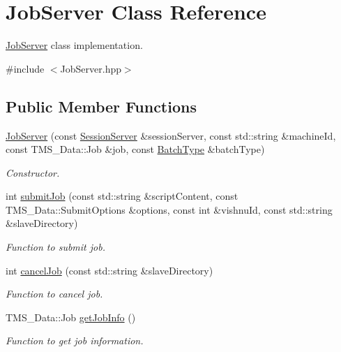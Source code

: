 \hypertarget{classJobServer}{
\section{JobServer Class Reference}
\label{classJobServer}
}


\hyperlink{classJobServer}{JobServer} class implementation.  




{\ttfamily \#include $<$JobServer.hpp$>$}

\subsection*{Public Member Functions}
\begin{DoxyCompactItemize}
\item 
\hyperlink{classJobServer_a85b283abac959954b934611ca3cd1d73}{JobServer} (const \hyperlink{classSessionServer}{SessionServer} \&sessionServer, const std::string \&machineId, const TMS\_\-Data::Job \&job, const \hyperlink{utilVishnu_8hpp_a864d748e7097d176552dd4c7635016ea}{BatchType} \&batchType)
\begin{DoxyCompactList}\small\item\em Constructor. \item\end{DoxyCompactList}\item 
int \hyperlink{classJobServer_a45fc18d575cf6fa41f70dc77b970c61d}{submitJob} (const std::string \&scriptContent, const TMS\_\-Data::SubmitOptions \&options, const int \&vishnuId, const std::string \&slaveDirectory)
\begin{DoxyCompactList}\small\item\em Function to submit job. \item\end{DoxyCompactList}\item 
int \hyperlink{classJobServer_ae0a6c00f5021c43f749c5d901b5f0a84}{cancelJob} (const std::string \&slaveDirectory)
\begin{DoxyCompactList}\small\item\em Function to cancel job. \item\end{DoxyCompactList}\item 
TMS\_\-Data::Job \hyperlink{classJobServer_aabb62434e6c6e894b198f6016e7dd275}{getJobInfo} ()
\begin{DoxyCompactList}\small\item\em Function to get job information. \item\end{DoxyCompactList}\item 

\end{DoxyCompactItemize}
